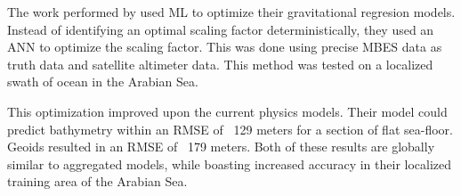 \par
The work performed by \cite{jena2012prediction} used \ac{ML} to optimize their gravitational regresion models.
Instead of identifying an optimal scaling factor deterministically, they used an \ac{ANN} to optimize the scaling factor.
This was done using precise \ac{MBES} data as truth data and satellite altimeter data.
This method was tested on a localized swath of ocean in the Arabian Sea.

\par
This optimization improved upon the current physics models.
Their model could predict bathymetry within an \ac{RMSE} of ~129 meters for a section of flat sea-floor.
Geoids resulted in an \ac{RMSE} of ~179 meters.
Both of these results are globally similar to aggregated models, while boasting increased accuracy in their localized training area of the Arabian Sea.

